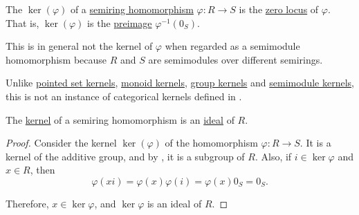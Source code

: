 \begin{definition}\label{def:semiring_kernel}
  The  \( \ker(\varphi) \) of a \hyperref[def:semiring/homomorphism]{semiring homomorphism} \( \varphi: R \to S \) is the \hyperref[def:zero_locus]{zero locus} of \( \varphi \). That is, \( \ker(\varphi) \) is the \hyperref[thm:def:function/properties/preimage]{preimage} \( \varphi^{-1}(0_S) \).

  This is in general not the kernel of \( \varphi \) when regarded as a semimodule homomorphism because \( R \) and \( S \) are semimodules over different semirings.

  Unlike \hyperref[def:pointed_set_kernel]{pointed set kernels}, \hyperref[thm:monoid_kernels]{monoid kernels}, \hyperref[thm:group_kernels]{group kernels} and \hyperref[thm:semimodule_kernels]{semimodule kernels}, this is not an instance of categorical kernels defined in .
\end{definition}

\begin{proposition}\label{thm:semiring_kernel}
  The \hyperref[def:semiring_kernel]{kernel} of a semiring homomorphism is an \hyperref[def:semiring_ideal]{ideal} of \( R \).
\end{proposition}
\begin{proof}
  Consider the kernel \( \ker(\varphi) \) of the homomorphism \( \varphi: R \to S \). It is a kernel of the additive group, and by , it is a subgroup of \( R \). Also, if \( i \in \ker \varphi \) and \( x \in R \), then
  \begin{equation*}
    \varphi(xi)
    =
    \varphi(x) \varphi(i)
    =
    \varphi(x) 0_S
    =
    0_S.
  \end{equation*}

  Therefore, \( x \in \ker \varphi \), and \( \ker \varphi \) is an ideal of \( R \).
\end{proof}

